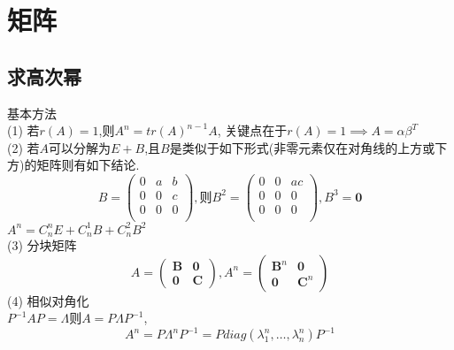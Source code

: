\documentclass[12pt, a4paper, oneside, UTF8]{ctexbook}
\begin{document}
% 
\else
\fi

\chapter{矩阵}
\section{求高次幂}
\begin{remark}
    基本方法 \\
    (1) 若$r(A)=1$,则$A^n=tr(A)^{n-1}A$, 关键点在于$r(A)=1\implies A=\alpha\beta^T$ \\
    (2) 若$A$可以分解为$E+B$,且$B$是类似于如下形式(非零元素仅在对角线的上方或下方)的矩阵则有如下结论.
    \[
    B=\left(
    \begin{array}{ccc}
        0& a& b \\
        0& 0& c \\
        0& 0& 0 \\
    \end{array}\right),
    \text{则}B^2=\left(\begin{array}{ccc}
        0& 0& ac \\
        0& 0& 0 \\
        0& 0& 0 \\
    \end{array}\right), B^3 = \mathbf{0}
    \]
    $A^n=C_{n}^{n}E+C_{n}^{1}B+C_{n}^{2}B^2$ \\
    (3) 分块矩阵
    \[
        A=\left(\begin{array}{cc}
        \mathbf{B} & \mathbf{0} \\
        \mathbf{0} & \mathbf{C}
    \end{array}\right), 
    A^n=\left(\begin{array}{cc}
        \mathbf{B}^n & \mathbf{0} \\
        \mathbf{0} & \mathbf{C}^n
    \end{array}\right)
    \] 
    (4) 相似对角化 \\
    $P^{-1}AP=\Lambda$则$A=P\Lambda P^{-1}$,
    \[
    A^n=P\Lambda^n P^{-1}=P diag(\lambda_1^n,\ldots,\lambda_n^n)P^{-1}
    \]
\end{remark}
\end{document}
